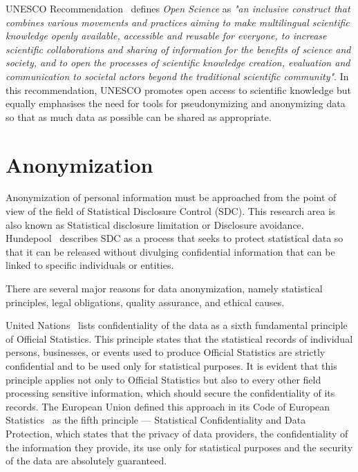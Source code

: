 \documentclass{article}
\begin{document}
UNESCO Recommendation~\cite{2022_EUA} defines \textit{Open Science} as \textit{"an
inclusive construct that combines various movements and practices aiming
to make multilingual scientific knowledge openly available, accessible and
reusable for everyone, to increase scientific collaborations and sharing of
information for the benefits of science and society, and to open the processes of scientific knowledge creation, evaluation and communication to societal actors beyond the traditional scientific community"}. In this recommendation, UNESCO promotes open access to scientific knowledge but equally emphasises the need for tools for pseudonymizing and anonymizing data so that as much data as possible can be shared as appropriate.

\section{Anonymization}

Anonymization of personal information must be approached from the point of view 
of the field of Statistical Disclosure Control (SDC). This research area is also known as Statistical disclosure limitation or Disclosure avoidance.
Hundepool~\cite{2012_Hundepool} describes SDC as a process that seeks to protect statistical data so that it can be released without divulging confidential information that can be linked to specific individuals or entities.

There are several major reasons for data anonymization, namely statistical principles, legal obligations, quality assurance, and ethical causes. 

United Nations~\cite{2015_UN} lists confidentiality of the data as a sixth fundamental principle of Official Statistics. This principle states that the statistical records of individual persons, businesses, or events used to produce Official Statistics are strictly confidential and to be used only for statistical purposes. It is evident that this principle applies not only to Official Statistics but also to every other field processing sensitive information, which should secure the confidentiality of its records. The European Union defined this approach in its Code of European Statistics~\cite{2018_Eurostat} as the fifth principle — Statistical Confidentiality and Data Protection, which states that the privacy of data providers, the confidentiality of the information they provide, its use only for statistical purposes and the security of the data are absolutely guaranteed.
\end{document}

